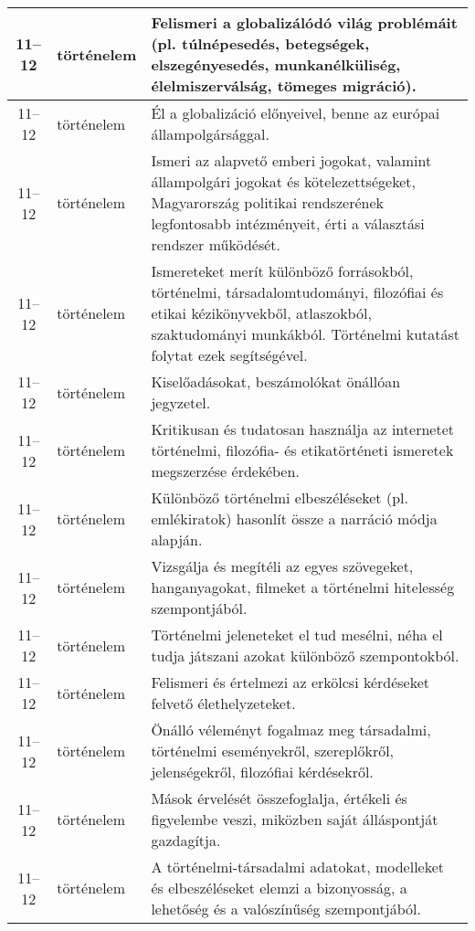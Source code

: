 \begin{small}
\begin{longtable}{c | p{2cm} |  p{11cm} }
              11--12 & történelem & Felismeri a globalizálódó világ problémáit (pl. túlnépesedés, betegségek, elszegényesedés, munkanélküliség, élelmiszerválság, tömeges migráció). \\ \hline
              11--12 & történelem & Él a globalizáció előnyeivel, benne az európai állampolgársággal. \\ \hline
              11--12 & történelem & Ismeri az alapvető emberi jogokat, valamint állampolgári jogokat és kötelezettségeket, Magyarország politikai rendszerének legfontosabb intézményeit, érti a választási rendszer működését. \\ \hline
              11--12 & történelem & Ismereteket merít különböző forrásokból, történelmi, társadalomtudományi, filozófiai és etikai kézikönyvekből, atlaszokból, szaktudományi munkákból. Történelmi kutatást folytat ezek segítségével. \\ \hline
              11--12 & történelem & Kiselőadásokat, beszámolókat önállóan jegyzetel. \\ \hline
              11--12 & történelem & Kritikusan és tudatosan használja az internetet történelmi, filozófia- és etikatörténeti ismeretek megszerzése érdekében. \\ \hline
              11--12 & történelem & Különböző történelmi elbeszéléseket (pl. emlékiratok) hasonlít össze a narráció módja alapján. \\ \hline
              11--12 & történelem & Vizsgálja és megítéli az egyes szövegeket, hanganyagokat, filmeket a történelmi hitelesség szempontjából. \\ \hline
              11--12 & történelem & Történelmi jeleneteket el tud mesélni, néha el tudja játszani azokat különböző szempontokból. \\ \hline
              11--12 & történelem & Felismeri és értelmezi az erkölcsi kérdéseket felvető élethelyzeteket. \\ \hline
              11--12 & történelem & Önálló véleményt fogalmaz meg társadalmi, történelmi eseményekről, szereplőkről, jelenségekről, filozófiai kérdésekről. \\ \hline
              11--12 & történelem & Mások érvelését összefoglalja, értékeli és figyelembe veszi, miközben saját álláspontját gazdagítja. \\ \hline
              11--12 & történelem & A történelmi-társadalmi adatokat, modelleket és elbeszéléseket elemzi a bizonyosság, a lehetőség és a valószínűség szempontjából. \\ \hline

\end{longtable}
\end{small}
